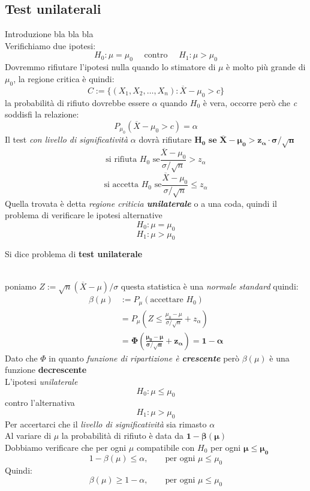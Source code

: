 \documentclass[]{article}
\begin{document}
    \subsection{Test unilaterali}
    Introduzione bla bla bla \\
    Verifichiamo due ipotesi:
    \[ H_0 : \mu = \mu_0 \quad \text{ contro } \quad H_1 : \mu > \mu_0 \]
    Dovremmo rifiutare l'ipotesi nulla quando lo stimatore di $\mu$ è molto più grande di $\mu_0$, la regione critica è quindi:
    \[ C := \{ (X_1, X_2, \ldots, X_n) : \overline{X} - \mu_0 > c \} \]
    la probabilità di rifiuto dovrebbe essere $\alpha$ quando $H_0$ è vera, occorre però che \textit{c} soddisfi la relazione:
    \[ P_{\mu_0} (\overline{X} - \mu_0 > c) = \alpha \]
    Il test \textit{con livello di significatività} $\alpha$ dovrà rifiutare $\boldsymbol{H_0 \text{ se } \overline{X} - \mu_0 > z_\alpha \cdot \sigma / \sqrt{n}}$
    \[ \text{si rifiuta } H_0 \text{ se} \frac{\overline{X} - \mu_0}{\sigma / \sqrt{n}} > z_\alpha \]
    \[ \text{si accetta } H_0 \text{ se} \frac{\overline{X} - \mu_0}{\sigma / \sqrt{n}} \leq z_\alpha \]
    Quella trovata è detta \textit{regione criticia \textbf{unilaterale}} o a una coda, quindi il problema di verificare le ipotesi alternative
    \[ H_0 : \mu = \mu_0 \]
    \[ H_1 : \mu > \mu_0 \]
    \centerline{Si dice problema di \textbf{test unilaterale}} \\[2ex]
    poniamo $Z := \sqrt{n}(\overline{X} - \mu) / \sigma$ questa statistica è una \textit{normale standard} quindi:
    \begin{equation*}
        \begin{split}
            \beta(\mu) &:= P_\mu(\text{accettare } H_0) \\
            &= P_\mu \left( Z \leq \frac{\mu_0 - \mu}{\sigma / \sqrt{n}} + z_\alpha \right) \\
            &= \boldsymbol{\Phi \left( \frac{\mu_0 - \mu}{\sigma / \sqrt{n}} + z_\alpha \right) = 1 - \alpha}
        \end{split}
    \end{equation*}
    Dato che $\Phi$ in quanto \textit{funzione di ripartizione è \textbf{crescente}} però $\beta(\mu)$ è una funzione \textbf{decrescente} \\
    L'ipotesi \textit{unilaterale}
    \[ H_0 : \mu \leq \mu_0 \]
    contro l'alternativa
    \[ H_1 : \mu > \mu_0 \]
    Per accertarci che il \textit{livello di significatività} sia rimasto $\alpha$ \\
    Al variare di $\mu$ la probabilità di rifiuto è data da $\boldsymbol{1 - \beta(\mu)}$ \\
    Dobbiamo verificare che per ogni $\mu$ compatibile con $H_0$ per ogni $\boldsymbol{\mu \leq \mu_0}$ 
    \[ 1 - \beta(\mu) \leq \alpha, \qquad \text{per ogni } \mu \leq \mu_0 \]
    Quindi:
    \[ \beta(\mu) \geq 1 - \alpha, \qquad \text{per ogni } \mu \leq \mu_0 \]
\end{document}
